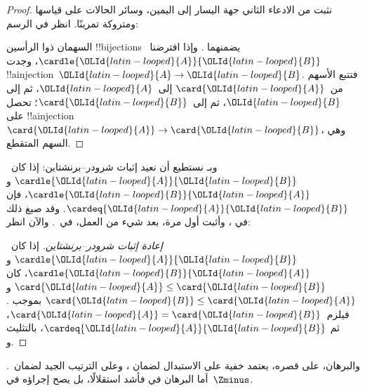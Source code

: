 \documentclass[../../../include/open-logic-section]{subfiles}
\begin{document}
\begin{proof}
نثبت من الادعاء الثاني جهة اليسار إلى اليمين، وسائر الحالات على
قياسها ومتروكة تمرينًا. انظر في الرسم:
\begin{center}
\end{center}
السهمان ذوا الرأسين !!{bijection}s يضمنهما
. وإذا افترضنا~$\cardle{{\OLId{latin-looped}{A}}}{{\OLId{latin-looped}{B}}}$، وجدت
!!a{injection}~${\OLId{latin-looped}{A}}\to {\OLId{latin-looped}{B}}$. فتتبع الأسهم من~$\card{{\OLId{latin-looped}{A}}}$ إلى~${\OLId{latin-looped}{A}}$، ثم إلى
${\OLId{latin-looped}{B}}$، ثم إلى~$\card{{\OLId{latin-looped}{B}}}$؛ تحصل على !!a{injection}
$\card{{\OLId{latin-looped}{A}}} \to \card{{\OLId{latin-looped}{B}}}$، وهي السهم المتقطع.
\end{proof}\noindent
وبـ نستطيع أن نعيد إثبات
شرودر--برنشتاين: إذا كان~$\cardle{{\OLId{latin-looped}{A}}}{{\OLId{latin-looped}{B}}}$ و$\cardle{{\OLId{latin-looped}{B}}}{{\OLId{latin-looped}{A}}}$، فإن
$\cardeq{{\OLId{latin-looped}{A}}}{{\OLId{latin-looped}{B}}}$. وقد صيغ ذلك في
، وأثبت أول مرة، بعد شيء
من العمل، في~. والآن انظر:

\begin{proof}[إعادة إثبات شرودر--برنشتاين]
إذا كان~$\cardle{{\OLId{latin-looped}{A}}}{{\OLId{latin-looped}{B}}}$ و$\cardle{{\OLId{latin-looped}{B}}}{{\OLId{latin-looped}{A}}}$، كان
$\card{{\OLId{latin-looped}{A}}} \leq \card{{\OLId{latin-looped}{B}}}$ و$\card{{\OLId{latin-looped}{B}}} \leq \card{{\OLId{latin-looped}{A}}}$ بموجب
. فيلزم~$\card{{\OLId{latin-looped}{A}}} = \card{{\OLId{latin-looped}{B}}}$، ثم
$\cardeq{{\OLId{latin-looped}{A}}}{{\OLId{latin-looped}{B}}}$، بالتثليث و.
\end{proof}
\noindent
والبرهان، على قصره، يعتمد خفية على الاستبدال لضمان
، وعلى الترتيب
الجيد لضمان~. أما البرهان في
 فأشد استقلالًا، بل يصح إجراؤه
في~$\Zminus$.
\end{document}
